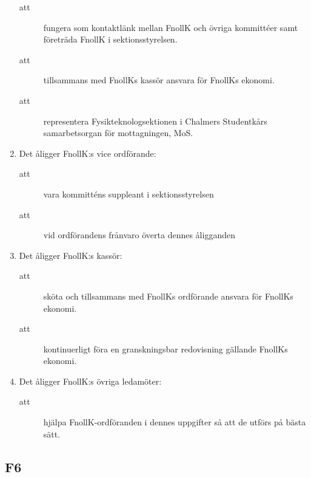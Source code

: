 \documentclass[11pt,a4paper]{article}
\begin{document}
\begin{enumerate}[\thesubsection .1]
\begin{description}
     
      \item[att] fungera som kontaktlänk mellan FnollK och övriga kommittéer samt företräda FnollK i sektionsstyrelsen.
      \item[att] tillsammans med FnollKs kassör ansvara för FnollKs ekonomi.
      \item[att] representera Fysikteknologsektionen i Chalmers Studentkårs samarbetsorgan för mottagningen, MoS.
    \end{description}

\item Det åligger FnollK:s vice ordförande:
\begin{description}
 \item[att] vara kommitténs suppleant i sektionsstyrelsen
 \item[att] vid ordförandens frånvaro överta dennes åligganden
\end{description}

  \item Det åligger FnollK:s kassör:
    \begin{description}
      \item[att] sköta och tillsammans med FnollKs ordförande an\-sva\-ra för FnollKs ekonomi.
      \item[att] kontinuerligt föra en granskningsbar redovisning gällande FnollKs  ekonomi.
    \end{description}


  \item Det åligger FnollK:s övriga ledamöter:
    \begin{description}
      \item[att] hjälpa FnollK-ordföranden i dennes uppgifter så att de utförs på bästa sätt.
    \end{description}

\end{enumerate}

\subsection{F6}
\end{document}
